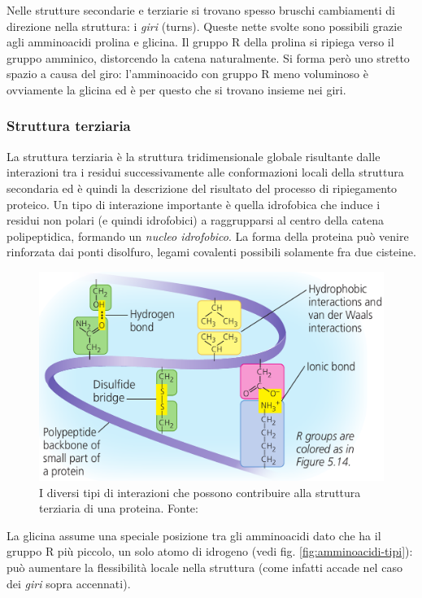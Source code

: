 {\par Nelle strutture secondarie e terziarie si trovano spesso bruschi cambiamenti di direzione nella struttura: i \textit{giri} (turns). Queste nette svolte sono possibili grazie agli amminoacidi prolina e glicina. Il gruppo R della prolina si ripiega verso il gruppo amminico, distorcendo la catena naturalmente. Si forma però uno stretto spazio a causa del giro: l'amminoacido con gruppo R meno voluminoso è ovviamente la glicina ed è per questo che si trovano insieme nei giri.

\subsubsection{Struttura terziaria}
La struttura terziaria è la struttura tridimensionale globale risultante dalle interazioni tra i residui successivamente alle conformazioni locali della struttura secondaria ed è quindi la descrizione del risultato del processo di ripiegamento proteico. Un tipo di interazione importante è quella idrofobica che induce i residui non polari (e quindi idrofobici) a raggrupparsi al centro della catena polipeptidica, formando un \textit{nucleo idrofobico}. La forma della proteina può venire rinforzata dai ponti disolfuro, legami covalenti possibili solamente fra due cisteine.

\begin{figure}[!htp]
	\centering
	\includegraphics[scale=0.35]{images/interazioni-proteine.png}
	\caption{I diversi tipi di interazioni che possono contribuire alla struttura terziaria di una proteina. Fonte: \cite{campbell}}
	\label{fig:interazioni-proteine}
\end{figure}

La glicina assume una speciale posizione tra gli amminoacidi dato che ha il gruppo R più piccolo, un solo atomo di idrogeno (vedi fig. \ref{fig:amminoacidi-tipi}): può aumentare la flessibilità locale nella struttura (come infatti accade nel caso dei \textit{giri} sopra accennati). 

}
